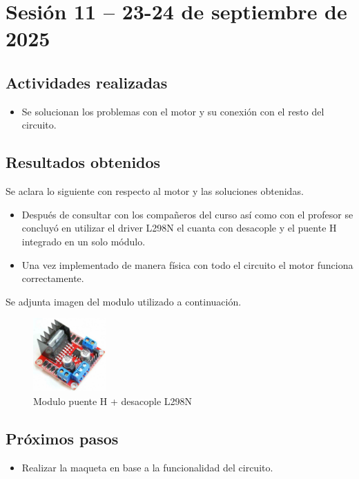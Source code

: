 \documentclass[12pt,letterpaper]{article}
\begin{document}
\section{Sesión 11 -- 23-24 de septiembre de 2025}
\subsection*{Actividades realizadas}
\begin{itemize}
    \item Se solucionan los problemas con el motor y su conexión con el resto del circuito.
\end{itemize}

\subsection*{Resultados obtenidos}
Se aclara lo siguiente con respecto al motor y las soluciones obtenidas.
\begin{itemize}
    \item Después de consultar con los compañeros del curso así como con el profesor se concluyó en utilizar el driver L298N el cuanta con desacople y el puente H integrado en un solo módulo.
    \item Una vez implementado de manera física con todo el circuito el motor funciona correctamente.
\end{itemize}
Se adjunta imagen del modulo utilizado a continuación.
\begin{figure}[H]
    \centering
    \includegraphics[width=0.25\textwidth]{images/L298N.png} %
    \caption{Modulo puente H + desacople L298N}
    \label{fig:L298N}
\end{figure}

\subsection*{Próximos pasos}
\begin{itemize}
    \item Realizar la maqueta en base a la funcionalidad del circuito.
\end{itemize}
\end{document}
